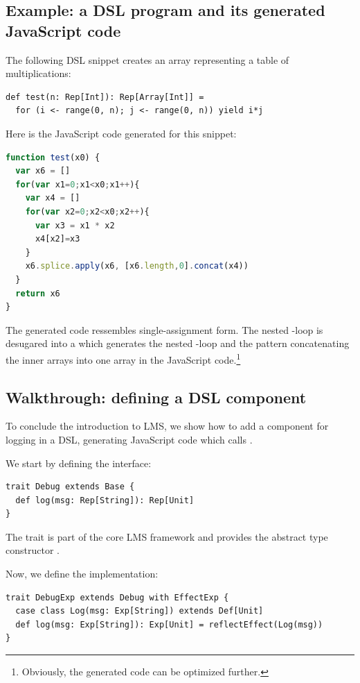 \documentclass[runningheads,a4paper]{llncs}
\begin{document}
\subsection{Example: a DSL program and its generated JavaScript code}

The following DSL snippet creates an array representing a table of
multiplications:
\begin{lstlisting}
def test(n: Rep[Int]): Rep[Array[Int]] =
  for (i <- range(0, n); j <- range(0, n)) yield i*j
\end{lstlisting}

Here is the JavaScript code generated for this snippet:
\begin{lstlisting}[language=JavaScript]
function test(x0) {
  var x6 = []
  for(var x1=0;x1<x0;x1++){
    var x4 = []
    for(var x2=0;x2<x0;x2++){
      var x3 = x1 * x2
      x4[x2]=x3
    }
    x6.splice.apply(x6, [x6.length,0].concat(x4))
  }
  return x6
}
\end{lstlisting}

The generated code ressembles single-assignment form. The nested
-loop is desugared into a  which generates the
nested -loop and the  pattern concatenating the
inner  arrays into one  array in the JavaScript
code.\footnote{Obviously, the generated code can be optimized further.}

\subsection{Walkthrough: defining a DSL component}\label{sec:defineDslComponent}

To conclude the introduction to LMS, we show how to add a component
for logging in a DSL, generating JavaScript code which calls
.

We start by defining the interface:
\begin{lstlisting}
trait Debug extends Base {
  def log(msg: Rep[String]): Rep[Unit]
}
\end{lstlisting}

The  trait is part of the core LMS framework and provides
the abstract type constructor .

Now, we define the implementation:
\begin{lstlisting}
trait DebugExp extends Debug with EffectExp {
  case class Log(msg: Exp[String]) extends Def[Unit]
  def log(msg: Exp[String]): Exp[Unit] = reflectEffect(Log(msg))
}
\end{lstlisting}
\end{document}
